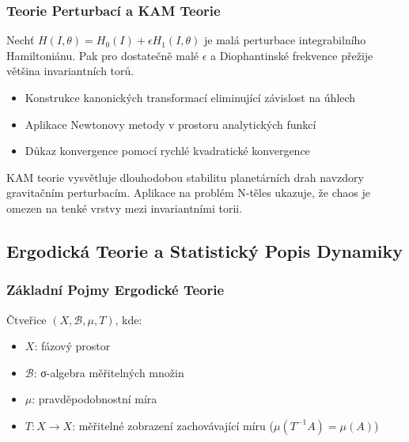 \subsubsection{Teorie Perturbací a KAM Teorie}

\begin{theorem}
Nechť $H(I, \theta) = H_0(I) + \epsilon H_1(I, \theta)$ je malá perturbace integrabilního Hamiltoniánu. Pak pro dostatečně malé $\epsilon$ a Diophantinské frekvence přežije většina invariantních torů.
\end{theorem}

\begin{proofsketch}
\begin{itemize}
\item Konstrukce kanonických transformací eliminující závislost na úhlech
\item Aplikace Newtonovy metody v prostoru analytických funkcí
\item Důkaz konvergence pomocí rychlé kvadratické konvergence
\end{itemize}
\end{proofsketch}

\begin{application}
KAM teorie vysvětluje dlouhodobou stabilitu planetárních drah navzdory gravitačním perturbacím. Aplikace na problém N-těles ukazuje, že chaos je omezen na tenké vrstvy mezi invariantními torii.
\end{application}

\spc

\subsection{Ergodická Teorie a Statistický Popis Dynamiky}

\subsubsection{Základní Pojmy Ergodické Teorie}

\begin{definition}
Čtveřice $(X, \mathcal{B}, \mu, T)$, kde:
\begin{itemize}
\item $X$: fázový prostor
\item $\mathcal{B}$: σ-algebra měřitelných množin
\item $\mu$: pravděpodobnostní míra
\item $T: X \to X$: měřitelné zobrazení zachovávající míru ($\mu(T^{-1}A) = \mu(A)$)
\end{itemize}
\end{definition}

